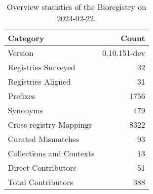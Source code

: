 \begin{table}
\caption{Overview statistics of the Bioregistry on 2024-02-22.}
\label{tab:bioregistry-summary}
\begin{tabular}{lr}
\toprule
Category & Count \\
\midrule
Version & 0.10.151-dev \\
Registries Surveyed & 32 \\
Registries Aligned & 31 \\
Prefixes & 1756 \\
Synonyms & 479 \\
Cross-registry Mappings & 8322 \\
Curated Mismatches & 93 \\
Collections and Contexts & 13 \\
Direct Contributors & 51 \\
Total Contributors & 388 \\
\bottomrule
\end{tabular}
\end{table}
